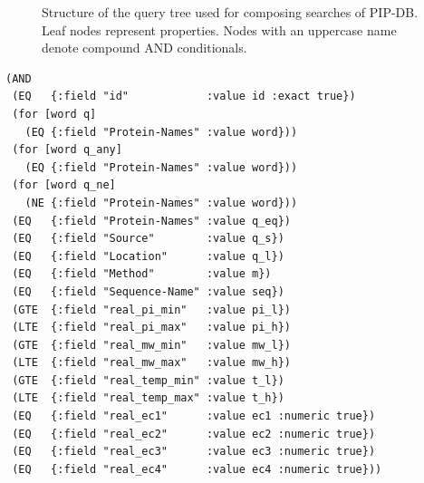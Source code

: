 \newpage
\vspace{4cm}

\begin{figure}[H]
\centering
{}
\caption[Structure of the query tree for composing searches]
        {Structure of the query tree used for composing searches of
          PIP-DB. Leaf nodes represent properties. Nodes
          with an uppercase name denote compound AND conditionals.}
\label{fig:query-tree}
\end{figure}


\vspace{1.5cm}


\lstset{language=Clojure}
\begin{lstlisting}[label=lst:query-tree,caption={%
      [Clojure implementation of the query tree]
      Implementation of the query tree in Clojure, from the file
      \texttt{query.clj}. Note the flat query hierarchy and the
      use of the \texttt{for} macro for expanding multivalued
      queries.}]
(AND
 (EQ   {:field "id"            :value id :exact true})
 (for [word q]
   (EQ {:field "Protein-Names" :value word}))
 (for [word q_any]
   (EQ {:field "Protein-Names" :value word}))
 (for [word q_ne]
   (NE {:field "Protein-Names" :value word}))
 (EQ   {:field "Protein-Names" :value q_eq})
 (EQ   {:field "Source"        :value q_s})
 (EQ   {:field "Location"      :value q_l})
 (EQ   {:field "Method"        :value m})
 (EQ   {:field "Sequence-Name" :value seq})
 (GTE  {:field "real_pi_min"   :value pi_l})
 (LTE  {:field "real_pi_max"   :value pi_h})
 (GTE  {:field "real_mw_min"   :value mw_l})
 (LTE  {:field "real_mw_max"   :value mw_h})
 (GTE  {:field "real_temp_min" :value t_l})
 (LTE  {:field "real_temp_max" :value t_h})
 (EQ   {:field "real_ec1"      :value ec1 :numeric true})
 (EQ   {:field "real_ec2"      :value ec2 :numeric true})
 (EQ   {:field "real_ec3"      :value ec3 :numeric true})
 (EQ   {:field "real_ec4"      :value ec4 :numeric true}))
\end{lstlisting}


